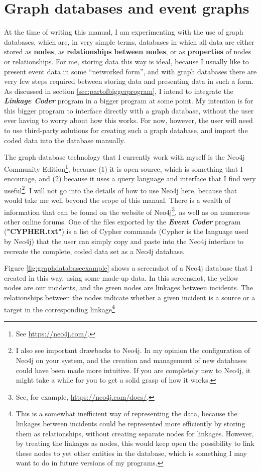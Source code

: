 \documentclass{memoir}
\begin{document}
\section{Graph databases and event graphs}
\label{sec:graphdatabasesandeventgraphs}

At the time of writing this manual, I am experimenting with the use of graph databases, which are, in very simple terms, databases in which all data are either stored as \textbf{nodes}, as \textbf{relationships between nodes}, or as \textbf{properties} of nodes or relationships. For me, storing data this way is ideal, because I usually like to present event data in some ``networked form'', and with graph databases there are very few steps required between storing data and presenting data in such a form. As discussed in section \ref{sec:partofbiggerprogram}, I intend to integrate the \textbf{\emph{Linkage Coder}} program in a bigger program at some point. My intention is for this bigger program to interface directly with a graph database, without the user ever having to worry about how this works. For now, however, the user will need to use third-party solutions for creating such a graph database, and import the coded data into the database manually.

The graph database technology that I currently work with myself is the Neo4j Community Edition\footnote{See \url{https://neo4j.com/}.}, because (1) it is open source, which is something that I encourage, and (2) because it uses a query language and interface that I find very useful\footnote{I also see important drawbacks to Neo4j. In my opinion the configuration of Neo4j on your system, and the creation and management of new databases could have been made more intuitive. If you are completely new to Neo4j, it might take a while for you to get a solid grasp of how it works.}. I will not go into the details of how to use Neo4j here, because that would take me well beyond the scope of this manual. There is a wealth of information that can be found on the website of Neo4j\footnote{See, for example, \url{https://neo4j.com/docs/}.}, as well as on numerous other online forums. One of the files exported by the \emph{\textbf{Event Coder}} program (\textbf{"CYPHER.txt"}) is a list of Cypher commands (Cypher is the language used by Neo4j) that the user can simply copy and paste into the Neo4j interface to recreate the complete, coded data set as a Neo4j database.    

Figure \ref{fig:graphdatabaseexample} shows a screenshot of a Neo4j database that I created in this way, using some made-up data. In this screenshot, the yellow nodes are our incidents, and the green nodes are linkages between incidents. The relationships between the nodes indicate whether a given incident is a source or a target in the corresponding linkage\footnote{This is a somewhat inefficient way of representing the data, because the linkages between incidents could be represented more efficiently by storing them as relationships, without creating separate nodes for linkages. However, by treating the linkages as nodes, this would keep open the possibility to link these nodes to yet other entities in the database, which is something I may want to do in future versions of my programs.} 
\end{document}
